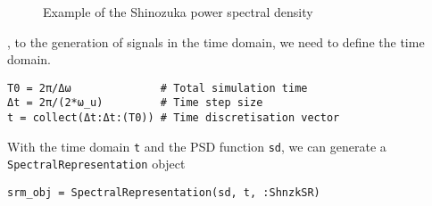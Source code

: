 \begin{figure}
\centering
\caption{Example of the Shinozuka power spectral density}
\end{figure}




, to the generation of signals in the time domain, we need to define the time domain.




\begin{verbatim}
T0 = 2π/Δω              # Total simulation time
Δt = 2π/(2*ω_u)         # Time step size
t = collect(Δt:Δt:(T0)) # Time discretisation vector
\end{verbatim}



With the time domain \texttt{t} and the PSD function \texttt{sd}, we can generate a \texttt{SpectralRepresentation} object




\begin{verbatim}
srm_obj = SpectralRepresentation(sd, t, :ShnzkSR)
\end{verbatim}


